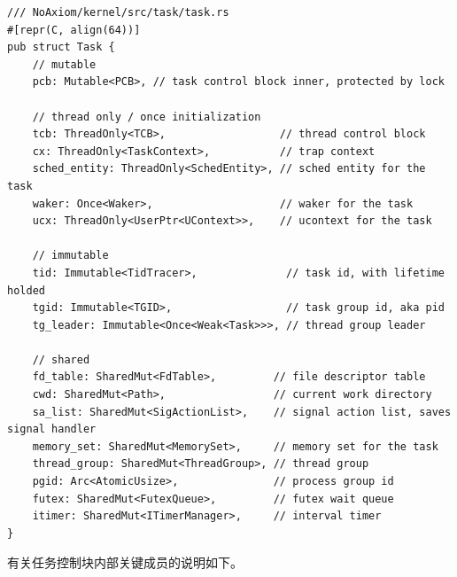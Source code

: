 \documentclass{article}
\begin{document}
\begin{lstlisting}
/// NoAxiom/kernel/src/task/task.rs
#[repr(C, align(64))]
pub struct Task {
    // mutable
    pcb: Mutable<PCB>, // task control block inner, protected by lock

    // thread only / once initialization
    tcb: ThreadOnly<TCB>,                  // thread control block
    cx: ThreadOnly<TaskContext>,           // trap context
    sched_entity: ThreadOnly<SchedEntity>, // sched entity for the task
    waker: Once<Waker>,                    // waker for the task
    ucx: ThreadOnly<UserPtr<UContext>>,    // ucontext for the task

    // immutable
    tid: Immutable<TidTracer>,              // task id, with lifetime holded
    tgid: Immutable<TGID>,                  // task group id, aka pid
    tg_leader: Immutable<Once<Weak<Task>>>, // thread group leader

    // shared
    fd_table: SharedMut<FdTable>,         // file descriptor table
    cwd: SharedMut<Path>,                 // current work directory
    sa_list: SharedMut<SigActionList>,    // signal action list, saves signal handler
    memory_set: SharedMut<MemorySet>,     // memory set for the task
    thread_group: SharedMut<ThreadGroup>, // thread group
    pgid: Arc<AtomicUsize>,               // process group id
    futex: SharedMut<FutexQueue>,         // futex wait queue
    itimer: SharedMut<ITimerManager>,     // interval timer
}
\end{lstlisting}

有关任务控制块内部关键成员的说明如下。
\end{document}
